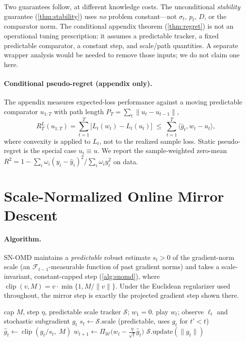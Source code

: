 \documentclass{article}
\newcommand{\ip}[2]{\langle #1, #2 \rangle}
\newcommand{\norm}[1]{\lVert #1 \rVert}
\newcommand{\gt}{g_t}
\newcommand{\clip}{\operatorname{clip}}
\begin{document}
Two guarantees follow, at different knowledge costs. The unconditional \emph{stability}
guarantee (\cref{thm:stability}) uses \emph{no} problem constant---not $\sigma_t$, $p_t$,
$D$, or the comparator norm. The conditional appendix theorem (\cref{thm:regret}) is not an
operational tuning prescription: it assumes a predictable tracker, a fixed predictable
comparator, a constant step, and scale/path quantities. A separate wrapper analysis would be
needed to remove those inputs; we do not claim one here.

\paragraph{Conditional pseudo-regret (appendix only).} The appendix measures expected-loss
performance against a moving predictable comparator
$u_{1:T}$ with path length $P_T=\sum_{t}\norm{u_t-u_{t-1}}$,
\begin{equation}
\label{eq:dynreg}
R_T^L(u_{1:T})=\sum_{t=1}^T\bigl[L_t(w_t)-L_t(u_t)\bigr]
\;\le\;\sum_{t=1}^T\ip{\bar g_t}{w_t-u_t},
\end{equation}
where convexity is applied to $L_t$, not to the realized sample loss. Static pseudo-regret is
the special case $u_t\equiv u$. We report the sample-weighted zero-mean $R^2=
1-\sum_i\omega_i(y_i-\hat y_i)^2/\sum_i\omega_i y_i^2$ on data.

\section{Scale-Normalized Online Mirror Descent}
\label{sec:method}

\paragraph{Algorithm.} SN-OMD maintains a \emph{predictable} robust estimate $s_t>0$
of the gradient-norm scale (an $\mathcal F_{t-1}$-measurable function of past gradient
norms) and takes a scale-invariant, constant-capped step (\cref{alg:snomd}), where
$\clip(v,M)=v\cdot\min\{1,M/\norm v\}$. Under the Euclidean regularizer used throughout, the
mirror step is exactly the projected gradient step shown there.

\begin{algorithm}[t]
  \caption{Scale-Normalized OMD (SN-OMD)}
  \label{alg:snomd}
  \begin{algorithmic}
     cap $M$, step $\eta$, predictable scale tracker
    $\mathcal S$; $w_1=0$.
    \STATE play $w_t$; observe $\ell_t$ and stochastic subgradient $\gt$
    \STATE $s_t \leftarrow \mathcal S.\mathrm{scale}$ \hfill (predictable, uses
    $\gt$ for $t'<t$)
    \STATE $\hat g_t \leftarrow \clip(\gt/s_t,\;M)$
    \STATE $w_{t+1}\leftarrow \Pi_{\mathcal W}\bigl(w_t-\tfrac{\eta}{\sqrt t}\hat g_t\bigr)$
    \STATE $\mathcal S.\mathrm{update}(\norm{\gt})$
    \ENDFOR
  \end{algorithmic}
\end{algorithm}
\end{document}
